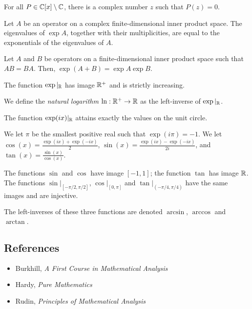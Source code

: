 \begin{thm}
    For all $P\in\mathbb{C}[x]\setminus\mathbb{C}$, there is a complex number $z$ such that
    $P(z)=0$.
\end{thm}
\begin{prop}
  Let $A$ be an operator on a complex finite-dimensional inner product space.
  The eigenvalues of $\exp A$, together with their multiplicities, are
  equal to the exponentials of the eigenvalues of $A$.
\end{prop}
\begin{prop}
  Let $A$ and $B$ be operators on a finite-dimensional inner product space such
  that $AB=BA$. Then, $\exp(A+B)=\exp A\exp B$.
\end{prop}
\begin{prop}
    The function $\exp|_{\mathbb{R}}$ has image $\mathbb{R}^+$ and is strictly increasing.
\end{prop}
\begin{defn}
    We define the \emph{natural logarithm} $\ln:\mathbb{R}^+\to\mathbb{R}$ as the left-inverse
    of $\exp|_{\mathbb{R}}$.
\end{defn}
\begin{prop}
    The function $\exp(ix)|_{\mathbb{R}}$ attains exactly the values on the unit circle.
\end{prop}
\begin{defn}
    We let $\pi$ be the smallest positive real such that $\exp(i\pi)=-1$. We let
    $\cos(x)=\frac{\exp(ix)+\exp(-ix)}2$,
    $\sin(x)=\frac{\exp(ix)-\exp(-ix)}{2i}$, and
    $\tan(x)=\frac{\sin(x)}{\cos(x)}$.
\end{defn}
\begin{prop}
    The functions $\sin$ and $\cos$ have image $[-1,1]$; the function $\tan$ has
    image $\mathbb{R}$. The functions $\sin|_{[-\pi/2,\pi/2]}$, $\cos|_{[0,\pi]}$ and
    $\tan|_{(-\pi/4,\pi/4)}$ have the same images and are injective.
\end{prop}
\begin{defn}
    The left-inverses of these three functions are denoted $\arcsin$,
    $\arccos$ and $\arctan$.
\end{defn}
\subsection*{References}
\begin{itemize}
    \item Burkhill, \emph{A First Course in Mathematical Analysis}
    \item Hardy, \emph{Pure Mathematics}
    \item Rudin, \emph{Principles of Mathematical Analysis}
\end{itemize}
